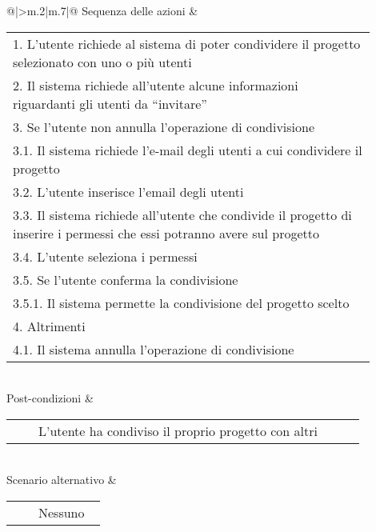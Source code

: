 \begin{longtable}{@{}|>{\centering\arraybackslash}m{.2\textwidth}|m{.7\textwidth}|@{}}
		Sequenza delle azioni & \begin{tabular}{m{0.9\linewidth}}\hspace{0.0cm}1. L'utente richiede al sistema di poter condividere il progetto selezionato con uno o più utenti\\\hspace{0.0cm}2. Il sistema richiede all'utente alcune informazioni riguardanti gli utenti da ``invitare''\\\hspace{0.0cm}3. Se l'utente non annulla l'operazione di condivisione\\\hspace{0.5cm}\hspace{0.0cm}3.1. Il sistema richiede l'e-mail degli utenti a cui condividere il progetto\\\hspace{0.5cm}\hspace{0.0cm}3.2. L'utente inserisce l'email degli utenti\\\hspace{0.5cm}\hspace{0.0cm}3.3. Il sistema richiede all'utente che condivide il progetto di inserire i permessi che essi potranno avere sul progetto\\\hspace{0.5cm}\hspace{0.0cm}3.4. L'utente seleziona i permessi\\\hspace{0.5cm}\hspace{0.0cm}3.5. Se l'utente conferma la condivisione\\\hspace{1.0cm}\hspace{0.5cm}\hspace{0.0cm}3.5.1. Il sistema permette la condivisione del progetto scelto\\\hspace{0.0cm}4. Altrimenti\\\hspace{0.5cm}\hspace{0.0cm}4.1. Il sistema annulla l'operazione di condivisione\\\end{tabular}\\
		Post-condizioni & \begin{tabular}{m{0.9\linewidth}}~~\llap{\textbullet}~~L'utente ha condiviso il proprio progetto con altri\\\end{tabular}\\
		Scenario alternativo & \begin{tabular}{m{0.9\linewidth}}~~\llap{\textbullet}~~Nessuno\\\end{tabular}\\\hline
		
	\end{longtable}

